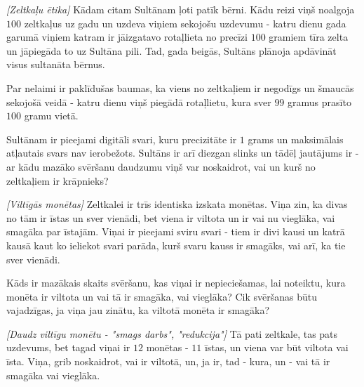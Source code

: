




\noindent 

\begin{problem}
\textit{[Zeltkaļu ētika]}
Kādam citam Sultānam ļoti patīk bērni. Kādu reizi viņš noalgoja $100$ zeltkaļus uz gadu un uzdeva viņiem sekojošu uzdevumu - katru dienu gada garumā viņiem katram ir jāizgatavo rotaļlieta no precīzi $100$ gramiem tīra zelta un jāpiegāda to uz Sultāna pili. Tad, gada beigās, Sultāns plānoja apdāvināt visus sultanāta bērnus. 

Par nelaimi ir paklīdušas baumas, ka viens no zeltkaļiem ir negodīgs un šmaucās sekojošā veidā - katru dienu viņš piegādā rotaļlietu, kura sver $99$ gramus prasīto $100$ gramu vietā.

Sultānam ir pieejami digitāli svari, kuru precizitāte ir $1$ grams un maksimālais atļautais svars nav ierobežots. Sultāns ir arī diezgan slinks un tādēļ jautājums ir - ar kādu mazāko svēršanu daudzumu viņš var noskaidrot, vai un kurš no zeltkaļiem ir krāpnieks?
\end{problem}
%

\begin{problem}
\textit{[Viltīgās monētas]}
Zeltkalei ir trīs identiska izskata monētas. Viņa zin, ka divas no tām ir īstas un sver vienādi, bet viena ir viltota un ir vai nu vieglāka, vai smagāka par īstajām. 
Viņai ir pieejami sviru svari - tiem ir divi kausi un katrā kausā kaut ko ieliekot svari parāda, kurš svaru kauss ir smagāks, vai arī, ka tie sver vienādi.

Kāds ir mazākais skaits svēršanu, kas viņai ir nepieciešamas, lai noteiktu, kura monēta ir viltota un vai tā ir smagāka, vai vieglāka? Cik svēršanas būtu vajadzīgas, ja viņa jau zinātu, ka viltotā monēta ir smagāka?

\end{problem}
%

\begin{problem}
\textit{[Daudz viltīgu monētu - "smags darbs", "redukcija"]}
Tā pati zeltkale, tas pats uzdevums, bet tagad viņai ir $12$ monētas - $11$ īstas, un viena var būt viltota vai īsta. Viņa, grib noskaidrot, vai ir viltotā, un, ja ir, tad - kura, un - vai tā ir smagāka vai vieglāka. 
\end{problem}
%


